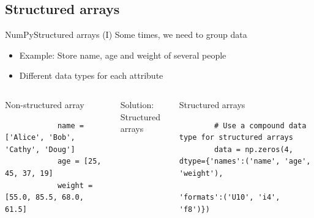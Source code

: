 \documentclass[10pt,compress]{beamer} %
\begin{document}
\subsection{Structured arrays}
\begin{frame}[fragile]{NumPy}{Structured arrays (I)}
	Some times, we need to group data
	\begin{itemize}
		\item Example: Store name, age and weight of several people
		\item Different data types for each attribute
	\end{itemize}
	\begin{columns}
 	   \column{\textwidth}
		\begin{exampleblock}{\footnotesize{Non-structured array}}
		\vspace{-0.2cm} 
		\begin{lstlisting}
			name = ['Alice', 'Bob', 'Cathy', 'Doug']
			age = [25, 45, 37, 19]
			weight = [55.0, 85.5, 68.0, 61.5]
		\end{lstlisting}
		\vspace{-0.2cm} 
	\end{exampleblock}
	
	\vspace{-0.2cm}
	\begin{flushleft}
	Solution: Structured arrays
	\end{flushleft}
	\vspace{-0.2cm}
	\begin{exampleblock}{\footnotesize{Structured arrays}}
		\vspace{-0.2cm} 
		\begin{lstlisting}
		# Use a compound data type for structured arrays
		data = np.zeros(4, dtype={'names':('name', 'age', 'weight'),
                          'formats':('U10', 'i4', 'f8')})
		\end{lstlisting}
		\vspace{-0.2cm} 
	\end{exampleblock}
	\end{columns}
\end{frame}
\end{document}
